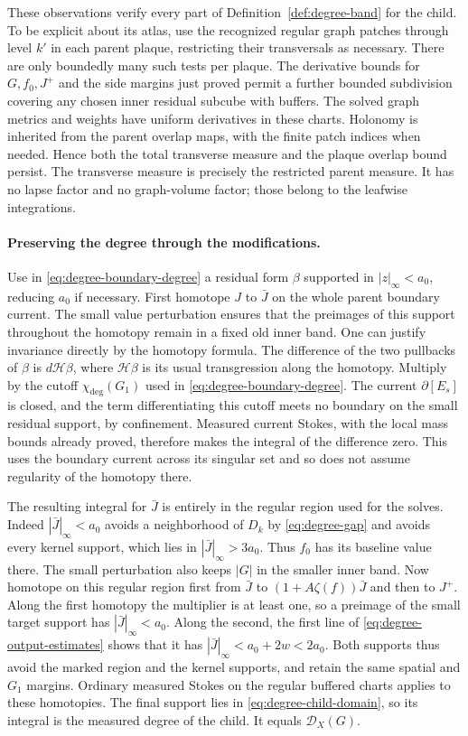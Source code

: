 These observations verify every part of
Definition~\ref{def:degree-band} for the child.  To be explicit about its
atlas, use the recognized regular graph patches through level $k'$ in
each parent plaque, restricting their transversals as necessary.  There
are only boundedly many such tests per plaque.  The derivative bounds
for $G,f_0,J^+$ and the side margins just proved permit a further bounded
subdivision covering any chosen inner residual subcube with buffers.
The solved graph metrics and weights have uniform derivatives in these
charts.  Holonomy is inherited from the parent overlap maps, with the
finite patch indices when needed.  Hence both the total transverse
measure and the plaque overlap bound persist.  The transverse measure
is precisely the restricted parent measure.  It has no lapse factor and
no graph-volume factor; those belong to the leafwise integrations.

\paragraph{Preserving the degree through the modifications.}
Use in \eqref{eq:degree-boundary-degree} a residual form $\beta$ supported
in $|z|_\infty<a_0$, reducing $a_0$ if necessary.  First homotope $J$ to
$\bar J$ on the whole parent boundary current.  The small value
perturbation ensures that the preimages of this support throughout the
homotopy remain in a fixed old inner band.  One can justify invariance
directly by the homotopy formula.  The difference of the two pullbacks
of $\beta$ is $d\mathcal H\beta$, where $\mathcal H\beta$ is its usual
transgression along the homotopy.  Multiply by the cutoff
$\chi_{\mathrm{deg}}(G_1)$ used
in \eqref{eq:degree-boundary-degree}.  The current $\partial[E_s]$ is
closed, and the term differentiating this cutoff meets no boundary on
the small residual support, by confinement.  Measured current Stokes,
with the local mass bounds already proved, therefore makes the integral
of the difference zero.  This uses the boundary current across its
singular set and so does not assume regularity of the homotopy there.

The resulting integral for $\bar J$ is entirely in the regular region
used for the solves.  Indeed $|\bar J|_\infty<a_0$ avoids a neighborhood
of $D_k$ by \eqref{eq:degree-gap} and avoids every kernel support, which
lies in $|\bar J|_\infty>3a_0$.  Thus $f_0$ has its baseline value there.
The small perturbation also keeps $|G|$ in the smaller inner band.
Now homotope on this regular region first from $\bar J$ to
$(1+A\zeta(f))\bar J$ and then to $J^+$.  Along the first homotopy the
multiplier is at least one, so a preimage of the small target support
has $|\bar J|_\infty<a_0$.  Along the second, the first line of
\eqref{eq:degree-output-estimates} shows that it has
$|\bar J|_\infty<a_0+2w<2a_0$.  Both supports thus avoid the marked
region and the kernel supports, and retain the same spatial and
$G_1$ margins.  Ordinary measured Stokes on the regular buffered charts
applies to these homotopies.  The final support lies in
\eqref{eq:degree-child-domain}, so its integral is the measured degree
of the child.  It equals $\mathcal D_X(G)$.

